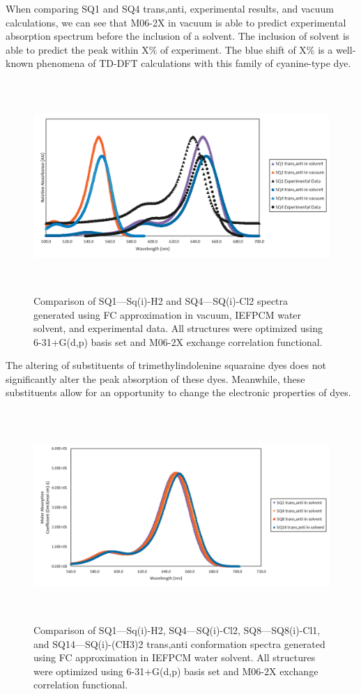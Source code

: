 \documentclass[journal=jacsat,manuscript=article]{achemso}
\begin{document}
When comparing SQ1 and SQ4 trans,anti, experimental results, and vacuum calculations, we can see that M06-2X in vacuum is able to predict experimental absorption spectrum before the inclusion of a solvent. The inclusion of solvent is able to predict the peak within X$\%$ of experiment. The blue shift of X$\%$ is a well-known phenomena of TD-DFT calculations with this family of cyanine-type dye.  
\begin{figure}[h]
    \centering
    \includegraphics[width=15cm,height=8cm]{figures/sq1-sq4.png}
    \caption{Comparison of  SQ1—Sq(i)-H2 and SQ4—SQ(i)-Cl2 spectra generated using FC approximation in vacuum, IEFPCM water solvent, and experimental data. All structures were optimized using 6-31+G(d,p) basis set and M06-2X exchange correlation functional.}
    \label{fig:my_label}
\end{figure}
The altering of substituents of trimethylindolenine squaraine dyes does not significantly alter the peak absorption of these dyes. Meanwhile, these substituents allow for an opportunity to change the electronic properties of dyes. 
\newpage

\newpage
\newpage
\begin{figure}[h]
    \centering
    \includegraphics[width=15cm,height=8cm]{figures/sq1_4_8_14.png}
    \caption{Comparison of  SQ1—Sq(i)-H2, SQ4—SQ(i)-Cl2, SQ8—SQ8(i)-Cl1, and SQ14—SQ(i)-(CH3)2 trans,anti conformation spectra generated using FC approximation in IEFPCM water solvent. All structures were optimized  using 6-31+G(d,p) basis set and M06-2X exchange correlation functional.}
    \label{fig:my_label}
\end{figure}
\end{document}
